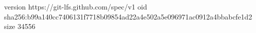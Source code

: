 version https://git-lfs.github.com/spec/v1
oid sha256:b99a140cc7406131f7718b09854ad22a4e502a5e096971ac0912a4bbabcfe1d2
size 34556
